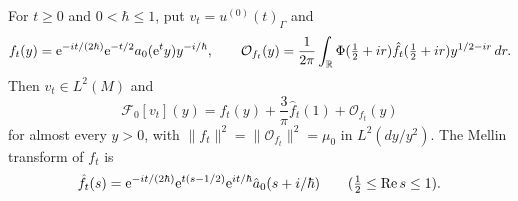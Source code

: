 \begin{lemma}\label{ev:approxmode}
For $t\ge0$ and $0<\hbar\le1$, put $v_t=u^{(0)}(t)_\Gamma$ and
\[
 f_t(y)=\mathrm{e}^{-it/(2\hbar)}\mathrm{e}^{-t/2}a_0(\mathrm{e}^ty)y^{-i/\hbar},\qquad
 \mathcal O_{f_t}(y)=\frac1{2\pi}\int_{\mathbb R}\Phi(\tfrac12+ir)\hat f_t(\tfrac12+ir)y^{1/2-ir}\,dr.
\]
Then $v_t\in L^2(M)$ and
\[
 \mathcal F_0[v_t](y)=f_t(y)+\frac3\pi\hat f_t(1)+\mathcal O_{f_t}(y)
\]
for almost every $y>0$, with $\|f_t\|^2=\|\mathcal O_{f_t}\|^2=\mu_0$ in $L^2(dy/y^2)$. The Mellin transform of $f_t$ is
\begin{equation}\label{ev:ft}
 \hat f_t(s)=\mathrm{e}^{-it/(2\hbar)}\mathrm{e}^{t(s-1/2)}\mathrm{e}^{it/\hbar}\hat a_0(s+i/\hbar)
 \qquad(\tfrac12\le\operatorname{Re}s\le1).
\end{equation}
\end{lemma}
